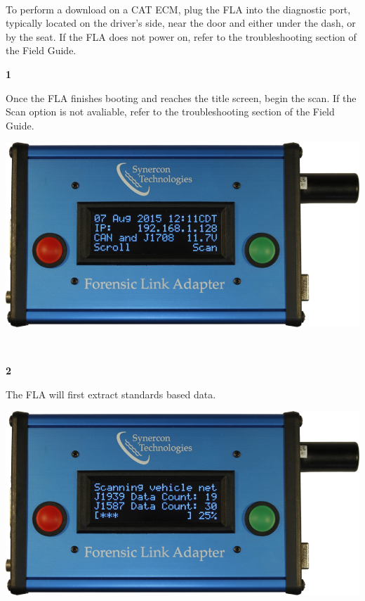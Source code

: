 \documentclass[11pt]{article}
\begin{document}
\paragraph{  }
To perform a download on a CAT ECM, plug the FLA into the diagnostic port, typically located on the driver's side, near the door and either under the dash, or by the seat. If the FLA does not power on, refer to the troubleshooting section of the Field Guide.
\\[\baselineskip]
\noindent\begin{minipage}{0.3\textwidth}%
\begin{center}
\textbf{1}\\[\baselineskip]
\end{center}
Once the FLA finishes booting and reaches the title screen, begin the scan. If the Scan option is not avaliable, refer to the troubleshooting section of the Field Guide.
\end{minipage}%
\hfill%
\begin{minipage}{0.6\textwidth}
\includegraphics[width=\linewidth]{../../media/fla_screens/ethernet_and_others/main/title_both}
\end{minipage}
\\[\baselineskip]
\noindent\begin{minipage}{0.3\textwidth}%
\begin{center}
\textbf{2}\\[\baselineskip]
\end{center}
The FLA will first extract standards based data.
\end{minipage}%
\hfill%
\begin{minipage}{0.6\textwidth}
\includegraphics[width=\linewidth]{../../media/fla_screens/ethernet_and_others/veh_scan/scan_25}
\end{minipage}
\end{document}
